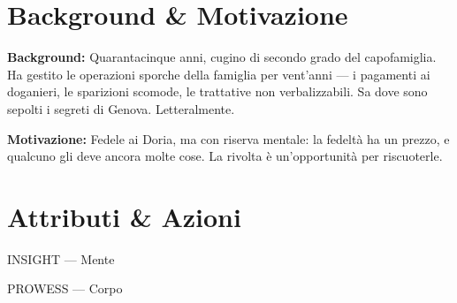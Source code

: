 \clearpage



\section*{Background \& Motivazione}

\begin{rulebox}{}
  \textbf{Background:} Quarantacinque anni, cugino di secondo grado del capofamiglia.
  Ha gestito le operazioni sporche della famiglia per vent'anni — i pagamenti ai
  doganieri, le sparizioni scomode, le trattative non verbalizzabili. Sa dove sono
  sepolti i segreti di Genova. Letteralmente.

  \medskip\noindent\textcolor{DoriaBlue}{\textbf{Motivazione:}} Fedele ai Doria, ma con
  riserva mentale: la fedeltà ha un prezzo, e qualcuno gli deve ancora molte cose.
  La rivolta è un'opportunità per riscuoterle.
\end{rulebox}

\section*{Attributi \& Azioni}

\begin{attributoblock}[DoriaBlue]{INSIGHT — Mente}
\end{attributoblock}
\begin{attributoblock}[DoriaBlue]{PROWESS — Corpo}
\end{attributoblock}

